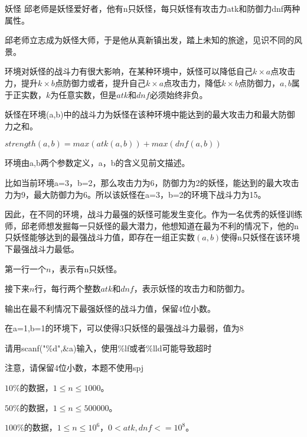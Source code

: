 \begin{problem}{妖怪}
邱老师是妖怪爱好者，他有n只妖怪，每只妖怪有攻击力atk和防御力dnf两种属性。

邱老师立志成为妖怪大师，于是他从真新镇出发，踏上未知的旅途，见识不同的风景。  

环境对妖怪的战斗力有很大影响，在某种环境中，妖怪可以降低自己$k\times a$点攻击力，提升$k\times b$点防御力或者，提升自己$k\times a$点攻击力，降低$k\times b$点防御力，$a,b$属于正实数，$k$为任意实数，但是$atk$和$dnf$必须始终非负。  

妖怪在环境(a,b)中的战斗力为妖怪在该种环境中能达到的最大攻击力和最大防御力之和。  

$strength(a,b)=max(atk(a,b))+max(dnf(a,b))$  

环境由a,b两个参数定义，a，b的含义见前文描述。  

比如当前环境a=3，b=2，那么攻击力为6，防御力为2的妖怪，能达到的最大攻击力为9，最大防御力为6。所以该妖怪在a=3，b=2的环境下战斗力为15。

因此，在不同的环境，战斗力最强的妖怪可能发生变化。作为一名优秀的妖怪训练师，邱老师想发掘每一只妖怪的最大潜力，他想知道在最为不利的情况下，他的n只妖怪能够达到的最强战斗力值，即存在一组正实数$(a,b)$使得n只妖怪在该环境下最强战斗力最低。
  
\InputFile
第一行一个$n$，表示有n只妖怪。

接下来$n$行，每行两个整数$atk$和$dnf$，表示妖怪的攻击力和防御力。

\OutputFile
输出在最不利情况下最强妖怪的战斗力值，保留4位小数。

\Example
\begin{example}
%
\end{example}

\Hint
在a=1,b=1的环境下，可以使得3只妖怪的最强战斗力最弱，值为8

请用scanf("\%d",\&a)输入，使用\%lf或者\%lld可能导致超时

注意，请保留4位小数，本题不使用spj

\Note
$10\%$的数据，$1\le n\le 1000$。

$50\%$的数据，$1\le n\le 500000$。

$100\%$的数据，$1\le n\le 10^6$，$0<atk,dnf<=10^8$。
\end{problem}
